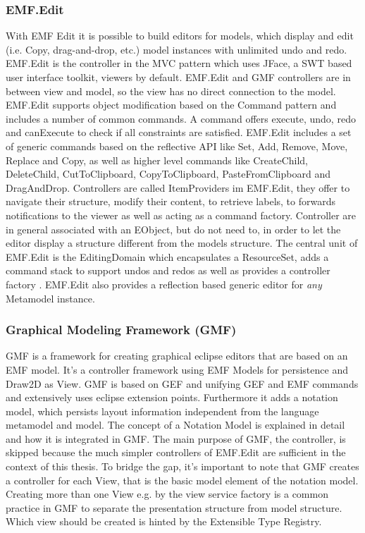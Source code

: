 \subsubsection{EMF.Edit}
With EMF Edit it is possible to build editors for models, which display and edit (i.e. Copy, drag-and-drop, etc.) model instances with unlimited undo and redo. EMF.Edit is the controller in the MVC pattern which uses JFace, a SWT based user interface toolkit, viewers by default. EMF.Edit and GMF controllers are in between view and model, so the view has no direct connection to the model. EMF.Edit supports object modification based on the Command pattern \cite{patterns} and includes a number of common commands. A command offers execute, undo, redo and canExecute to check if all constraints are satisfied.  EMF.Edit includes a set of generic commands based on the reflective API like Set, Add, Remove, Move, Replace and Copy, as well as  higher level commands like CreateChild, DeleteChild, CutToClipboard, CopyToClipboard, PasteFromClipboard and DragAndDrop. Controllers are called ItemProviders im EMF.Edit, they offer to navigate their structure, modify their content, to retrieve labels, to forwards notifications to the viewer as well as acting as a command factory. Controller are in general associated with an EObject, but do not need to, in order to let the editor display a structure different from the models structure. The central unit of EMF.Edit is the EditingDomain which encapsulates a ResourceSet, adds a command stack to support undos and redos as well as provides a controller factory \cite{EMF2nd}. EMF.Edit also provides a reflection based generic editor for \emph{any} Metamodel instance.  


\subsubsection {Graphical Modeling Framework (GMF)}
GMF is a framework for creating graphical eclipse editors that are based on an EMF model. It's a controller framework using EMF Models for persistence and Draw2D as View. GMF is based on GEF  and unifying GEF and EMF commands and extensively uses eclipse extension points. Furthermore it adds a notation model, which persists layout information independent from the language metamodel and model. The concept of a Notation Model is explained in detail  and how it is integrated in GMF. The main purpose of GMF, the controller, is skipped because the much simpler controllers of EMF.Edit are sufficient in the context of this thesis. To bridge the gap, it's important to note that GMF creates a controller for each View, that is the basic model element of the notation model. Creating more than one View e.g. by the view service factory is a common practice in GMF to separate the presentation structure from model structure. Which view should be created is hinted by the Extensible Type Registry.


